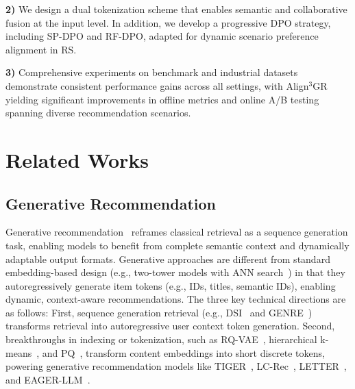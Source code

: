\documentclass[letterpaper]{article} %
\begin{document}
%
\textbf{2)} We design a dual tokenization scheme that enables semantic and collaborative fusion at the input level. In addition, we develop a progressive DPO strategy, including SP-DPO and RF-DPO, adapted for dynamic scenario preference alignment in RS.
%

%
\textbf{3)} Comprehensive experiments on benchmark and industrial datasets demonstrate consistent performance gains across all settings, with Align$^3$GR yielding significant improvements in offline metrics and online A/B testing spanning diverse recommendation scenarios.
%

%
\section{Related Works}
\subsection{Generative Recommendation}
Generative recommendation~\cite{gr1} reframes classical retrieval as a sequence generation task, enabling models to benefit from complete semantic context and dynamically adaptable output formats. Generative approaches are different from standard embedding-based design (e.g., two-tower models with ANN search~\cite{twt1}) in that they autoregressively generate item tokens (e.g., IDs, titles, semantic IDs), enabling dynamic, context-aware recommendations. The three key technical directions are as follows: First, sequence generation retrieval (e.g., DSI~\cite{dsi1,dsi2} and GENRE~\cite{genre}) transforms retrieval into autoregressive user context token generation. Second, breakthroughs in indexing or tokenization, such as RQ-VAE~\cite{rqvae}, hierarchical k-means~\cite{kmeans}, and PQ~\cite{pq}, transform content embeddings into short discrete tokens, powering generative recommendation models like TIGER~\cite{tiger}, LC-Rec~\cite{lc-rec}, LETTER~\cite{letter}, and EAGER-LLM~\cite{eager-llm}.
%

%
\end{document}
